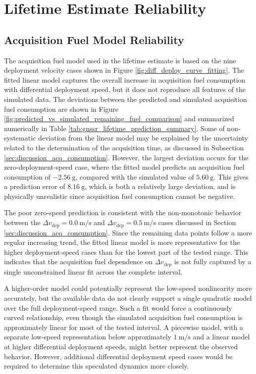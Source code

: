 \section{Lifetime Estimate Reliability}


\subsection{Acquisition Fuel Model Reliability}

The acquisition fuel model used in the lifetime estimate is based on the nine deployment velocity cases shown in Figure \ref{fig:diff_deploy_curve_fitting}. The fitted linear model captures the overall increase in acquisition fuel consumption with differential deployment speed, but it does not reproduce all features of the simulated data. The deviations between the predicted and simulated acquisition fuel consumption are shown in Figure \ref{fig:predicted_vs_simulated_remaining_fuel_comparison} and summarized numerically in Table \ref{tab:gnssr_lifetime_prediction_summary}. Some of non-systematic deviation from the linear model may be explained by the uncertainty related to the determination of the acquisition time, as discussed in Subsection \ref{sec:discussion_acq_consumption}. However, the largest deviation occurs for the zero-deployment-speed case, where the fitted model predicts an acquisition fuel consumption of $-2.56~\mathrm{g}$, compared with the simulated value of $5.60~\mathrm{g}$. This gives a prediction error of $8.16~\mathrm{g}$, which is both a relatively large deviation, and is physically unrealistic since acquisition fuel consumption cannot be negative.

The poor zero-speed prediction is consistent with the non-monotonic behavior between the $\Delta v_{\mathrm{dep}}=0.0~\mathrm{m/s}$ and $\Delta v_{\mathrm{dep}}=0.5~\mathrm{m/s}$ cases discussed in Section \ref{sec:discussion_acq_consumption}. Since the remaining data points follow a more regular increasing trend, the fitted linear model is more representative for the higher deployment-speed cases than for the lowest part of the tested range. This indicates that the acquisition fuel dependence on $\Delta v_{\mathrm{dep}}$ is not fully captured by a single unconstrained linear fit across the complete interval.

A higher-order model could potentially represent the low-speed nonlinearity more accurately, but the available data do not clearly support a single quadratic model over the full deployment-speed range. Such a fit would force a continuously curved relationship, even though the simulated acquisition fuel consumption is approximately linear for most of the tested interval. A piecewise model, with a separate low-speed representation below approximately $1~\mathrm{m/s}$ and a linear model at higher differential deployment speeds, might better represent the observed behavior. However, additional differential deployment speed cases would be required to determine this speculated dynamics more closely.

